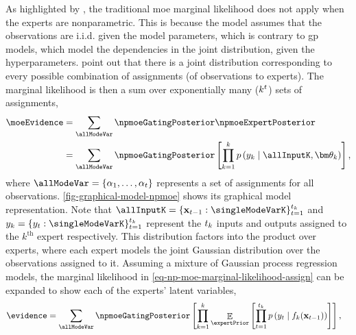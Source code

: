 \documentclass{mimosis-class/mimosis}
\numberwithin{equation}{chapter}
\DeclareMathOperator{\E}{\mathbb{E}}
\newcommand{\numData}{\ensuremath{t}}
\newcommand{\modeInd}{\ensuremath{k}}
\newcommand{\NumData}{\ensuremath{\MakeUppercase{\numData}}}
\newcommand{\ModeInd}{\ensuremath{\MakeUppercase{\modeInd}}}
\newcommand{\singleData}[1]{\ensuremath{#1_{\numData}}}
\newcommand{\allData}[1]{\ensuremath{\MakeUppercase{#1}}}
\newcommand{\allOutputK}{\ensuremath{\mode{\allOutput}}}
\newcommand{\mode}[1]{\ensuremath{#1_{\modeInd}}}
\newcommand{\x}{\ensuremath{\mathbf{x}}}
\newcommand{\y}{\ensuremath{y}}
\newcommand{\singleInput}{\ensuremath{\x_{\numData-1}}}
\newcommand{\singleOutput}{\ensuremath{\singleData{\y}}}
\newcommand{\allOutput}{\ensuremath{\allData{\y}}}
\newcommand{\modeVar}{\ensuremath{\alpha}}
\newcommand{\latentFunc}{\ensuremath{f}}
\newcommand{\expertParamsK}{\ensuremath{\mode{\bm\theta}}}
\begin{document}
{As highlighted by \cite{rasmussenInfinite2001},
the traditional \acrshort{moe} marginal likelihood does not apply when the
experts are nonparametric.
This is because the model assumes that the observations are i.i.d. given the model parameters,
which is contrary to \acrshort{gp} models, which model the dependencies in the joint distribution, given the
hyperparameters.
\cite{rasmussenInfinite2001} point out that there is a joint distribution corresponding to every possible
combination of assignments (of observations to experts).
The marginal likelihood is then a sum over exponentially many (\(\ModeInd^{\NumData}\)) sets of assignments,
\small
\begin{align}  \label{eq-np-moe-marginal-likelihood-assign}
\moeEvidence &= \sum_{\allModeVar} \npmoeGatingPosterior \npmoeExpertPosterior  \nonumber \\
&= \sum_{\allModeVar} \npmoeGatingPosterior
\left[ \prod_{\modeInd=1}^\ModeInd p\left(\allOutputK \mid \allInputK, \expertParamsK \right) \right],
\end{align}
\normalsize
where \(\allModeVar = \{\modeVar_1, \ldots, \modeVar_\NumData \}\) represents a set of assignments for all observations.
\cref{fig-graphical-model-npmoe} shows its graphical model representation.
Note that \(\allInputK = \{\singleInput : \singleModeVarK \}_{\numData=1}^{\NumData_{\modeInd}}\) and
\(\allOutputK = \{\singleOutput : \singleModeVarK \}_{\numData=1}^{\NumData_{\modeInd}}\)
represent the \(\NumData_{\modeInd}\) inputs and outputs assigned to the \(\modeInd^{\text{th}}\)
expert respectively.
This distribution factors into the product over experts, where each expert models the joint Gaussian distribution
over the observations assigned to it.
Assuming a mixture of Gaussian process regression models,
the marginal likelihood in \cref{eq-np-moe-marginal-likelihood-assign}
can be expanded to show each of the experts' latent variables,
\begin{align} \label{eq-np-moe-marginal-likelihood}
\evidence
&= \sum_{\allModeVar} \npmoeGatingPosterior
\left[ \prod_{\modeInd=1}^\ModeInd
\E_{\expertPrior} \left[
\prod_{\numData=1}^{\NumData_{\modeInd}}
p\left(\singleOutput \mid \mode{\latentFunc}(\singleInput) \right)
\right] \right],
\end{align}
}
\end{document}
